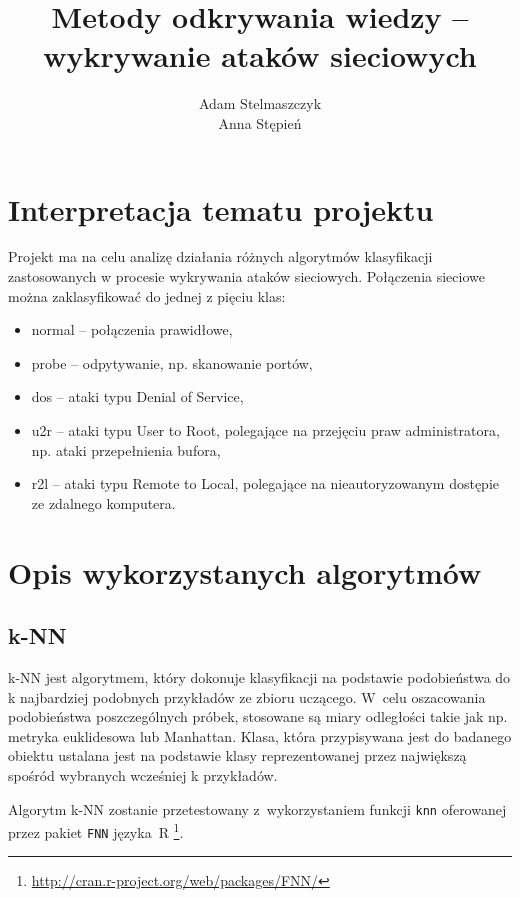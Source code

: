 \documentclass[a4paper, 12pt]{article}
\title{Metody odkrywania wiedzy -- wykrywanie ataków sieciowych}
\author{Adam Stelmaszczyk\\ Anna Stępień}
\begin{document}

\nocite{*}
\maketitle

\tableofcontents

\newpage

\section{Interpretacja tematu projektu}
Projekt ma na celu analizę działania różnych algorytmów klasyfikacji zastosowanych
w procesie wykrywania ataków sieciowych. Połączenia sieciowe można zaklasyfikować do jednej
z pięciu klas:
\begin{itemize}
  \item normal -- połączenia prawidłowe,
  \item probe -- odpytywanie, np. skanowanie portów,
  \item dos -- ataki typu Denial of Service,
  \item u2r -- ataki typu User to Root, polegające na przejęciu praw administratora, 
np. ataki przepełnienia bufora,
  \item r2l -- ataki typu Remote to Local, polegające na nieautoryzowanym dostępie ze zdalnego komputera.
\end{itemize} 

\section{Opis wykorzystanych algorytmów}\label{algorithms}

\subsection{k-NN}

k-NN jest algorytmem, który dokonuje klasyfikacji na podstawie podobieństwa do k 
najbardziej podobnych przykładów ze zbioru uczącego. W~celu oszacowania podobieństwa 
poszczególnych próbek, stosowane są miary odległości takie jak np. metryka euklidesowa lub Manhattan. 
Klasa, która przypisywana jest do badanego obiektu ustalana jest na podstawie klasy 
reprezentowanej przez największą spośród wybranych wcześniej k przykładów.

Algorytm k-NN zostanie przetestowany z~wykorzystaniem funkcji 
\texttt{knn} oferowanej przez pakiet \texttt{FNN} języka~R 
\footnote{\url{http://cran.r-project.org/web/packages/FNN/}}.
\end{document}
